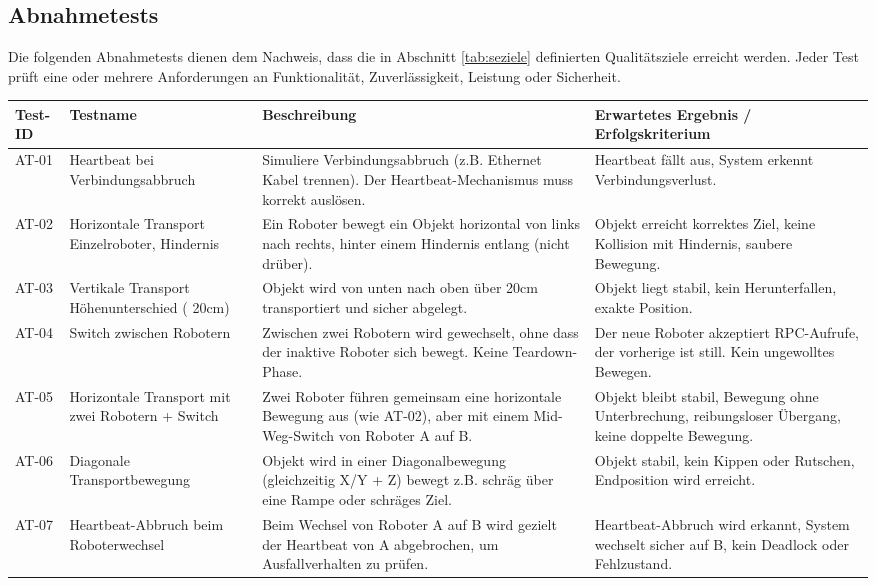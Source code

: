 \subsection{Abnahmetests}

Die folgenden Abnahmetests dienen dem Nachweis, dass die in Abschnitt \ref{tab:seziele} definierten Qualitätsziele erreicht werden. Jeder Test prüft eine oder mehrere Anforderungen an Funktionalität, Zuverlässigkeit, Leistung oder Sicherheit.

\begin{table}[h!]
\centering
\begin{tabular}{p{1.6cm}|p{4cm}|p{5.5cm}|p{5.5cm}}
\hline
\textbf{Test-ID} & \textbf{Testname} & \textbf{Beschreibung} & \textbf{Erwartetes Ergebnis / Erfolgskriterium} \\
\hline
AT-01 & Heartbeat bei Verbindungsabbruch & Simuliere Verbindungsabbruch (z.B. Ethernet Kabel trennen). Der Heartbeat-Mechanismus muss korrekt auslösen. & Heartbeat fällt aus, System erkennt Verbindungsverlust.\\
\hline
AT-02 & Horizontale Transport Einzelroboter, Hindernis & Ein Roboter bewegt ein Objekt horizontal von links nach rechts, hinter einem Hindernis entlang (nicht drüber). & Objekt erreicht korrektes Ziel, keine Kollision mit Hindernis, saubere Bewegung. \\
\hline
AT-03 & Vertikale Transport  Höhenunterschied ( 20cm) & Objekt wird von unten nach oben über 20cm transportiert und sicher abgelegt. & Objekt liegt stabil, kein Herunterfallen, exakte Position. \\
\hline
AT-04 & Switch zwischen Robotern & Zwischen zwei Robotern wird gewechselt, ohne dass der inaktive Roboter sich bewegt. Keine Teardown-Phase. & Der neue Roboter akzeptiert RPC-Aufrufe, der vorherige ist still. Kein ungewolltes Bewegen. \\
\hline
AT-05 & Horizontale Transport mit zwei Robotern + Switch & Zwei Roboter führen gemeinsam eine horizontale Bewegung aus (wie AT-02), aber mit einem Mid-Weg-Switch von Roboter A auf B. & Objekt bleibt stabil, Bewegung ohne Unterbrechung, reibungsloser Übergang, keine doppelte Bewegung. \\
\hline
AT-06 & Diagonale Transportbewegung & Objekt wird in einer Diagonalbewegung (gleichzeitig X/Y + Z) bewegt z.B. schräg über eine Rampe oder schräges Ziel. & Objekt stabil, kein Kippen oder Rutschen, Endposition wird erreicht. \\
\hline
AT-07 & Heartbeat-Abbruch beim Roboterwechsel & Beim Wechsel von Roboter A auf B wird gezielt der Heartbeat von A abgebrochen, um Ausfallverhalten zu prüfen. & Heartbeat-Abbruch wird erkannt, System wechselt sicher auf B, kein Deadlock oder Fehlzustand. \\

\end{tabular}
\end{table}
